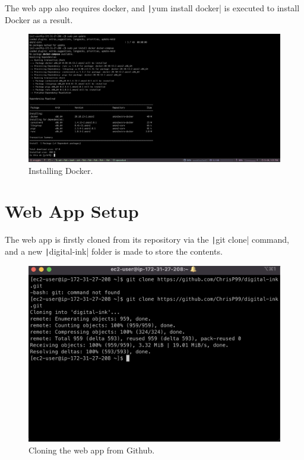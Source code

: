 The web app also requires docker, and \texttt|yum install docker| is executed to install Docker as a result.

\begin{figure}[!htbp]
    \centering
    \includegraphics[scale=0.3]{resources/ec2/installing-docker}
    \caption{Installing Docker.}
    \label{fig:webapp-docker}
\end{figure}

\section{Web App Setup}\label{sec:web-app-setup2}

The web app is firstly cloned from its repository via the \texttt|git clone| command, and a new
\texttt|digital-ink| folder is made to store the contents.

\begin{figure}[!htbp]
    \centering
    \includegraphics[scale=0.3]{resources/ec2/webapp-clone}
    \caption{Cloning the web app from Github.}
    \label{fig:webapp-clone}
\end{figure}

